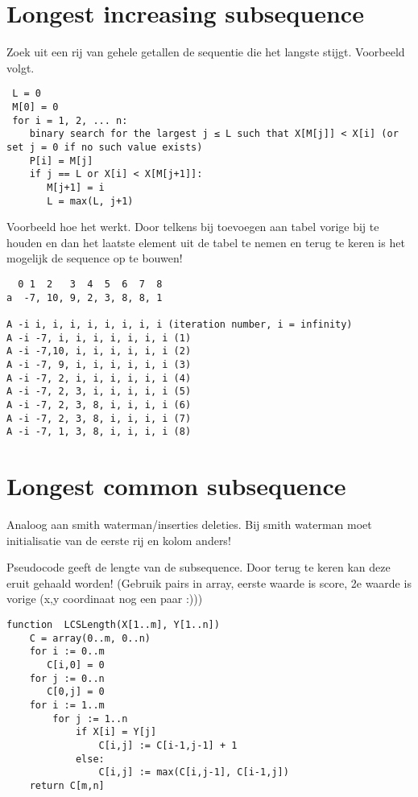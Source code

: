 \documentclass[a4paper,10pt,oneside]{report}
\begin{document}
\section{Longest increasing subsequence}
Zoek uit een rij van gehele getallen de sequentie die het langste stijgt. Voorbeeld volgt.
\begin{verbatim}
 L = 0
 M[0] = 0
 for i = 1, 2, ... n:
    binary search for the largest j ≤ L such that X[M[j]] < X[i] (or set j = 0 if no such value exists)
    P[i] = M[j]
    if j == L or X[i] < X[M[j+1]]:
       M[j+1] = i
       L = max(L, j+1)
\end{verbatim}
Voorbeeld hoe het werkt. Door telkens bij toevoegen aan tabel vorige bij te houden en dan het laatste element uit de tabel te nemen en terug te keren is het mogelijk de sequence op te bouwen!
\begin{verbatim}
  0 1  2   3  4  5  6  7  8
a  -7, 10, 9, 2, 3, 8, 8, 1

A -i i, i, i, i, i, i, i, i (iteration number, i = infinity)
A -i -7, i, i, i, i, i, i, i (1)
A -i -7,10, i, i, i, i, i, i (2)
A -i -7, 9, i, i, i, i, i, i (3)
A -i -7, 2, i, i, i, i, i, i (4)
A -i -7, 2, 3, i, i, i, i, i (5)
A -i -7, 2, 3, 8, i, i, i, i (6)
A -i -7, 2, 3, 8, i, i, i, i (7)
A -i -7, 1, 3, 8, i, i, i, i (8)
\end{verbatim}

\section{Longest common subsequence}
Analoog aan smith waterman/inserties deleties. Bij smith waterman moet initialisatie van de eerste rij en kolom anders!

Pseudocode geeft de lengte van de subsequence.
Door terug te keren kan deze eruit gehaald worden! (Gebruik pairs in array, eerste waarde is score, 2e waarde is vorige (x,y coordinaat nog een paar :)))
\begin{verbatim}
function  LCSLength(X[1..m], Y[1..n])
    C = array(0..m, 0..n)
    for i := 0..m
       C[i,0] = 0
    for j := 0..n
       C[0,j] = 0
    for i := 1..m
        for j := 1..n
            if X[i] = Y[j]
                C[i,j] := C[i-1,j-1] + 1
            else:
                C[i,j] := max(C[i,j-1], C[i-1,j])
    return C[m,n]
\end{verbatim}
\end{document}
